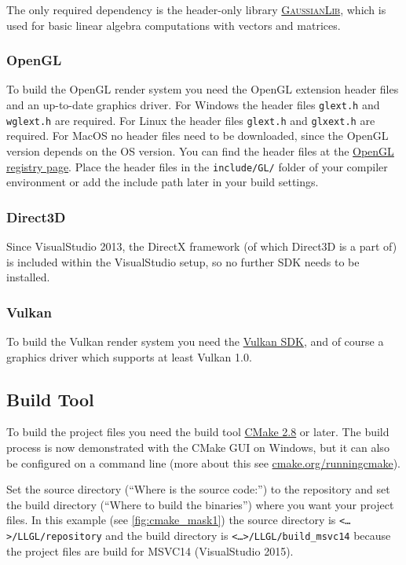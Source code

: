 \documentclass{article}
\begin{document}
The only required dependency is the header-only library
\href{https://github.com/LukasBanana/GaussianLib}{\textsc{GaussianLib}},
which is used for basic linear algebra computations with vectors and matrices.

\subsubsection*{OpenGL}

To build the OpenGL render system you need the OpenGL extension header files and an up-to-date graphics driver.
For Windows the header files \texttt{glext.h} and \texttt{wglext.h} are required.
For Linux the header files \texttt{glext.h} and \texttt{glxext.h} are required.
For MacOS no header files need to be downloaded, since the OpenGL version depends on the OS version.
You can find the header files at the \href{https://www.opengl.org/registry/#headers}{OpenGL registry page}.
Place the header files in the \texttt{include/GL/} folder of your compiler environment
or add the include path later in your build settings.

\subsubsection*{Direct3D}

Since VisualStudio 2013, the DirectX framework (of which Direct3D is a part of) is included within
the VisualStudio setup, so no further SDK needs to be installed.

\subsubsection*{Vulkan}

To build the Vulkan render system you need the \href{https://lunarg.com/vulkan-sdk/}{Vulkan SDK},
and of course a graphics driver which supports at least Vulkan 1.0.

\subsection*{Build Tool}

To build the \LLGL project files you need the build tool \href{https://cmake.org/}{CMake 2.8} or later.
The build process is now demonstrated with the CMake GUI on Windows, but it can also be configured
on a command line (more about this see \href{https://cmake.org/runningcmake/}{cmake.org/runningcmake}).

Set the source directory (``Where is the source code:'') to the \LLGL repository
and set the build directory (``Where to build the binaries'') where you want your project files.
In this example (see \ref{fig:cmake_mask1}) the source directory is \texttt{<\dots>/LLGL/repository}
and the build directory is \texttt{<\dots>/LLGL/build\_msvc14} because the project files are build
for MSVC14 (VisualStudio 2015).
\end{document}
